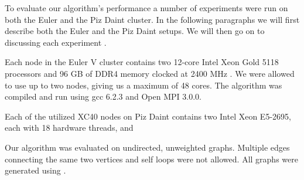 To evaluate our algorithm's performance a number of experiments were run on both the Euler and the
Piz Daint cluster. In the following paragraphs we will first describe both the Euler and the Piz
Daint setups. We will then go on to discussing each experiment .

Each node in the Euler V cluster contains two 12-core Intel Xeon Gold 5118 processors and 96 GB of
DDR4 memory clocked at 2400 MHz \cite{Euler}. We were allowed to use up to two nodes, giving us a
maximum of 48 cores. The algorithm was compiled and run using gcc 6.2.3 and Open MPI 3.0.0.

Each of the utilized XC40 nodes on Piz Daint contains two Intel Xeon E5-2695, each with 18 hardware threads,
and 

Our algorithm was evaluated on undirected, unweighted graphs. Multiple edges connecting the same
two vertices and self loops were not allowed. All graphs were generated using \cite{Parmat} .


